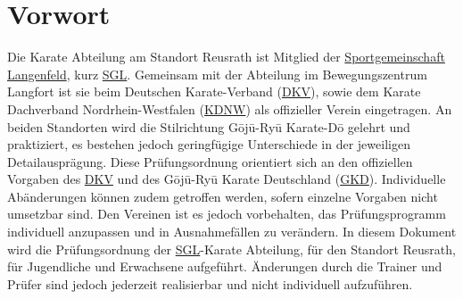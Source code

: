 	\vspace{12pt}
	\section{Vorwort}
		Die Karate Abteilung am Standort Reusrath ist Mitglied der \href{https://www.sglangenfeld.de/}{Sportgemeinschaft Langenfeld}, kurz \href{https://www.sglangenfeld.de/}{SGL}. Gemeinsam mit der Abteilung im Bewegungszentrum Langfort ist sie beim Deutschen Karate-Verband (\href{https://www.karate.de/}{DKV}), sowie dem Karate Dachverband Nordrhein-Westfalen (\href{https://www.karate.nrw/}{KDNW}) als offizieller Verein eingetragen. An beiden Standorten wird die Stilrichtung G\={o}j\={u}-Ry\={u} Karate-D\={o} gelehrt und praktiziert, es bestehen jedoch geringfügige Unterschiede in der jeweiligen Detailausprägung.
	\vspace{4pt}\newline
		Diese Prüfungsordnung orientiert sich an den offiziellen Vorgaben des \href{https://www.karate.de/}{DKV} und des G\={o}j\={u}-Ry\={u} Karate Deutschland (\href{https://www.karate-gkd.de/}{GKD}). Individuelle Abänderungen können zudem getroffen werden, sofern einzelne Vorgaben nicht umsetzbar sind. Den Vereinen ist es jedoch vorbehalten, das Prüfungsprogramm individuell anzupassen und in Ausnahmefällen zu verändern.
	\vspace{4pt}\newline
		In diesem Dokument wird die Prüfungsordnung der \href{https://www.sglangenfeld.de/}{SGL}-Karate Abteilung, für den Standort Reusrath, für Jugendliche und Erwachsene aufgeführt. Änderungen durch die Trainer und Prüfer sind jedoch jederzeit realisierbar und nicht individuell aufzuführen.
